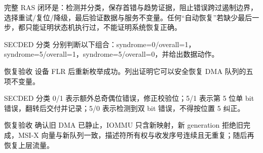\begin{keyidea}
完整 RAS 闭环是：检测并分类，保存首错与趋势证据，阻止错误跨过遏制边界，选择重试/复位/降级，最后验证数据与服务不变量。任何“自动恢复”若缺少最后一步，都只能证明状态机执行过，不能证明系统恢复正确。
\end{keyidea}

\begin{chapterexercise}{SECDED 分类}
分别判断以下组合：syndrome=0/overall=1，syndrome=5/overall=1，syndrome=5/overall=0，并给出数据动作。
\end{chapterexercise}

\begin{chapterexercise}{恢复验收}
设备 FLR 后重新枚举成功。列出证明它可以安全恢复 DMA 队列的五项不变量。
\end{chapterexercise}

\begin{chapteranswer}{SECDED 分类}
0/1 表示额外总奇偶位错误，修正校验位；5/1 表示第 5 位单 bit 错误，翻转后交付并记录；5/0 表示检测到双 bit 错误，不得按位置 5 纠正。
\end{chapteranswer}

\begin{chapteranswer}{恢复验收}
确认旧 DMA 已静止，IOMMU 只含新映射，新 generation 拒绝旧完成，MSI-X 向量与新队列一致，描述符所有权与收发序号连续且无重复；随后再恢复上层流量。
\end{chapteranswer}
